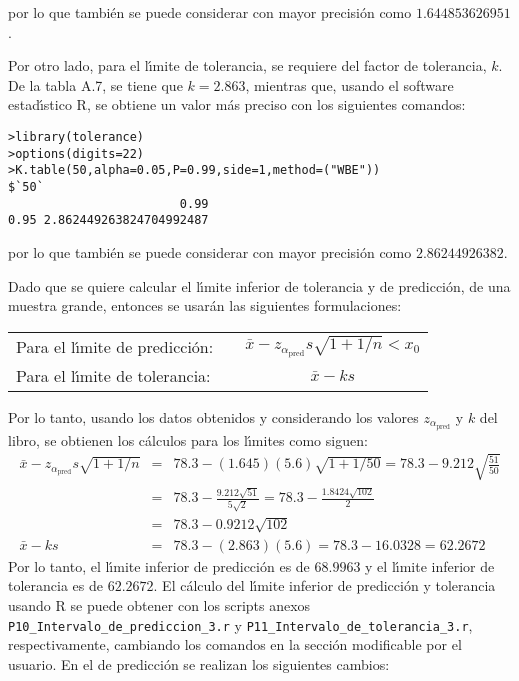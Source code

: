 \begin{solucion}
\begin{verbatim}
 \end{verbatim}
 \vspace{-0.5cm}
 por lo que tambi\'en se puede considerar con mayor precisi\'on como $1.644853626951$.
 \par 
 Por otro lado, para el l\'{\i}mite de tolerancia, se requiere del factor de tolerancia, $k$. De la tabla A.7, se tiene que $k=2.863$, mientras que, usando el software estad\'{\i}stico R, se obtiene un valor m\'as preciso con los siguientes comandos:
 \begin{verbatim}
>library(tolerance)
>options(digits=22)
>K.table(50,alpha=0.05,P=0.99,side=1,method=("WBE"))
$`50`
                        0.99
0.95 2.862449263824704992487
 \end{verbatim}
 \vspace{-0.5cm}
 por lo que tambi\'en se puede considerar con mayor precisi\'on como $2.86244926382$.
 \par 
 Dado que se quiere calcular el l\'{\i}mite inferior de tolerancia y de predicci\'on, de una muestra grande, entonces se usar\'an las siguientes formulaciones:
 \begin{center}
  \begin{tabular}{lcc}
   Para el l\'{\i}mite de predicci\'on: & \hspace{1cm} & $\bar{x} - z_{\alpha_{\text{pred}}}s\sqrt{1+1/n} < x_0$ \\
   Para el l\'{\i}mite de tolerancia: &  & $\bar{x}-ks$
  \end{tabular}
 \end{center}
 Por lo tanto, usando los datos obtenidos y considerando los valores $z_{\alpha_{\text{pred}}}$ y $k$ del libro, se obtienen los c\'alculos para los l\'{\i}mites como siguen:
 \begin{eqnarray*}
  \bar{x} - z_{\alpha_{\text{pred}}}s\sqrt{1+1/n} & = & 78.3 - (1.645)(5.6)\sqrt{1+1/50} = 78.3 - 9.212\sqrt{\frac{51}{50}} \\
  & = & 78.3 - \frac{9.212\sqrt{51}}{5\sqrt{2}} = 78.3 - \frac{1.8424\sqrt{102}}{2} \\
  & = & 78.3 - 0.9212\sqrt{102} \\
  \bar{x}-ks & = & 78.3 - (2.863)(5.6) = 78.3 - 16.0328 = 62.2672
 \end{eqnarray*}
 Por lo tanto, el l\'{\i}mite inferior de predicci\'on es de $68.9963$ y el l\'{\i}mite inferior de tolerancia es de $62.2672$. El c\'alculo del l\'{\i}mite inferior de predicci\'on y tolerancia usando R se puede obtener con los scripts anexos \texttt{P10\_Intervalo\_de\_prediccion\_3.r} y \texttt{P11\_Intervalo\_de\_tolerancia\_3.r}, respectivamente, cambiando los comandos en la secci\'on modificable por el usuario. En el de predicci\'on se realizan los siguientes cambios:

\end{solucion}
